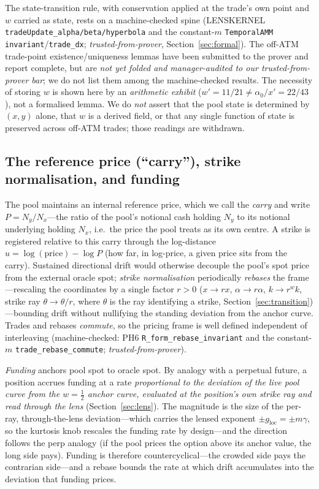 \documentclass[11pt]{article}
\newcommand{\tfp}{\emph{trusted-from-prover}}
\begin{document}
The state-transition rule, with conservation applied at the trade's own point and
$w$ carried as state, rests on a machine-checked spine (LENSKERNEL
\texttt{tradeUpdate\_alpha/beta/hyperbola} and the constant-$m$ \texttt{TemporalAMM}
\texttt{invariant}/\texttt{trade\_dx}; \tfp{}, Section~\ref{sec:formal}). The
off-ATM trade-point existence/uniqueness lemmas have been submitted to the prover
and report complete, but are \emph{not yet folded and manager-audited to our \tfp{}
bar}; we do not list them among the machine-checked results. The necessity of
storing $w$ is shown here by an \emph{arithmetic exhibit}
($w'=11/21\neq\alpha_0/x'=22/43$), not a formalised lemma. We do
\emph{not} assert that the pool state is determined by $(x,y)$ alone, that $w$ is a
derived field, or that any single function of state is preserved across off-ATM
trades; those readings are withdrawn.

\subsection{The reference price (``carry''), strike normalisation, and funding}
The pool maintains an internal reference price, which we call the \emph{carry} and
write $P=N_{y}/N_{x}$---the ratio of the pool's notional cash holding $N_{y}$ to
its notional underlying holding $N_{x}$, i.e.\ the price the pool treats as its own
centre. A strike is registered relative to this carry through the log-distance
$u=\log(\mathrm{price})-\log P$ (how far, in log-price, a given price sits from the
carry). Sustained directional drift would otherwise decouple the pool's spot price
from the external oracle spot; \emph{strike normalisation} periodically
\emph{rebases} the frame---rescaling the coordinates by a single factor $r>0$
($x\to rx$, $\alpha\to r\alpha$, $k\to r^{w}k$, strike ray $\theta\to\theta/r$,
where $\theta$ is the ray identifying a strike, Section~\ref{sec:transition})---bounding drift
without nullifying the standing deviation from the anchor curve. Trades and rebases \emph{commute}, so the pricing frame is
well defined independent of interleaving (machine-checked: PH6
\texttt{R\_form\_rebase\_invariant} and the constant-$m$
\texttt{trade\_rebase\_commute}; \tfp{}).

\emph{Funding} anchors pool spot to oracle spot. By analogy with a perpetual
future, a position accrues funding at a rate \emph{proportional to the deviation
of the live pool curve from the $w=\tfrac12$ anchor curve, evaluated at the
position's own strike ray and read through the lens} (Section~\ref{sec:lens}). The
magnitude is the size of the per-ray, through-the-lens deviation---which carries
the lensed exponent $\pm g_{\mathrm{loc}}=\pm m\gamma$, so the kurtosis knob
rescales the funding rate by design---and the direction follows the perp analogy
(if the pool prices the option above its anchor value, the long side pays).
Funding is therefore countercyclical---the crowded side pays the contrarian
side---and a rebase bounds the rate at which drift accumulates into the deviation
that funding prices.
\end{document}
